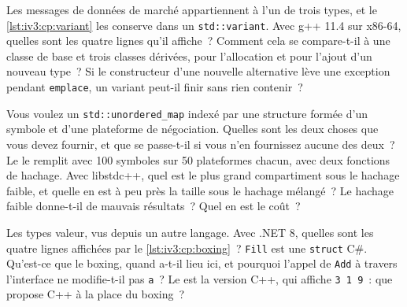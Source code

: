 \begin{question}\label{iq:iv3:cpp:38}
Les messages de données de marché appartiennent à l'un de trois types, et le \cref{lst:iv3:cp:variant} les conserve dans un \texttt{std::variant}. Avec g++ 11.4 sur x86-64, quelles sont les quatre lignes qu'il affiche~? Comment cela se compare-t-il à une classe de base et trois classes dérivées, pour l'allocation et pour l'ajout d'un nouveau type~? Si le constructeur d'une nouvelle alternative lève une exception pendant \texttt{emplace}, un variant peut-il finir sans rien contenir~?
\label{lst:iv3:cp:variant}
\end{question}

\begin{question}\label{iq:iv3:cpp:39}
Vous voulez un \texttt{std::unordered\_map} indexé par une structure formée d'un symbole et d'une plateforme de négociation. Quelles sont les deux choses que vous devez fournir, et que se passe-t-il si vous n'en fournissez aucune des deux~? Le  le remplit avec 100 symboles sur 50 plateformes chacun, avec deux fonctions de hachage. Avec libstdc++, quel est le plus grand compartiment sous le hachage faible, et quelle en est à peu près la taille sous le hachage mélangé~? Le hachage faible donne-t-il de mauvais résultats~? Quel en est le coût~?
\label{lst:iv3:cp:keyhash}
\end{question}

\begin{question}\label{iq:iv3:cpp:40}
Les types valeur, vus depuis un autre langage. Avec .NET 8, quelles sont les quatre lignes affichées par le \cref{lst:iv3:cp:boxing}~? \texttt{Fill} est une \texttt{struct} C\#. Qu'est-ce que le boxing, quand a-t-il lieu ici, et pourquoi l'appel de \texttt{Add} à travers l'interface ne modifie-t-il pas \texttt{a}~? Le  est la version C++, qui affiche \texttt{3 1 9}~: que propose C++ à la place du boxing~?
\label{lst:iv3:cp:boxing}
\label{lst:iv3:cp:valuecpp}
\end{question}


